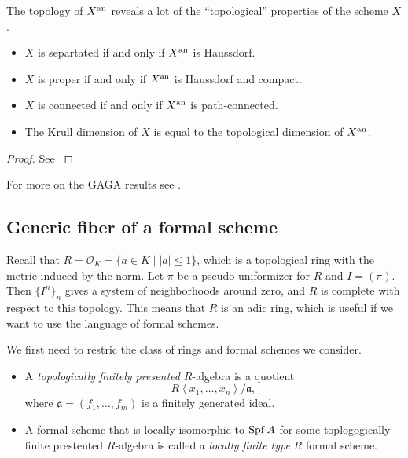 \begin{theorem}
	The topology of $X{}^{\text{an}}$ reveals a lot of the ``topological'' properties of the scheme $X$. 
	\begin{itemize}
		\item $X$ is separtated if and only if $X{}^{\text{an}}$ is Haussdorf. 
		\item $X$ is proper if and only if $X{}^{\text{an}}$ is Haussdorf and compact. 
		\item  $X$ is connected if and only if $X{}^{\text{an}}$ is path-connected. 
		\item The Krull dimension of  $X$ is equal to the topological dimension of $X{}^{\text{an}}$. 
	\end{itemize}
\end{theorem}
\begin{proof}
	See \cite[][thm.\ 3.4.8]{berkovichSpectralTheoryAnalytic2012}
\end{proof}

For more on the GAGA results see \cite[][sec.\ 3.4]{berkovichSpectralTheoryAnalytic2012}.

\subsection{Generic fiber of a formal scheme} \label{sec:generic_fiber_of_a_formal_scheme}

Recall that $R = \mathcal{O}_K = \{a \in K \mid |a| \le 1\} $, which is a topological ring with the metric induced by the norm. 
Let $\pi$ be a pseudo-uniformizer for $R$ and $I = (\pi)$. 
Then $\{I^{n}\}_n$ gives a system of neighborhoods around zero, and $R$ is complete with respect to this topology. 
This means that $R$ is an adic ring, which is useful if we want to use the language of formal schemes. 

We first need to restric the class of rings and formal schemes we consider. 
\begin{definition}\label{def:topologically_finite_presentation_algebra}
	\begin{itemize}
		\item 
	A \emph{topologically finitely presented} $R$-algebra is a quotient \[
		R\left<x_1, \ldots, x_n \right> / \mathfrak{a} 
	,\] where $\mathfrak{a}  = (f_1, \ldots, f_m)$ is a finitely generated ideal. 
\item A formal scheme that is locally isomorphic to $\operatorname{Spf} A$ for some toplogogically finite prestented $R$-algebra is called a \emph{locally finite type} $R$ formal scheme. 
	\end{itemize}

\end{definition}

